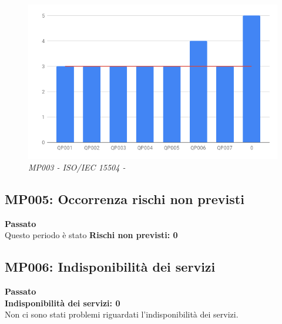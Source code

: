 \begin{figure}[H]
    \centering
	\includegraphics[scale=0.7]{./images/RA_spice.png}
    \caption{\textit{MP003 - ISO/IEC 15504 - }}
\end{figure}

\subsection{MP005:  Occorrenza rischi non previsti}
\textbf{Passato}\\
Questo periodo è stato 
\textbf{Rischi non previsti: 0}

\subsection{MP006: Indisponibilità dei servizi}
\textbf{Passato}\\
\textbf{Indisponibilità dei servizi: 0}\\
Non ci sono stati problemi riguardati l'indisponibilità dei servizi.

